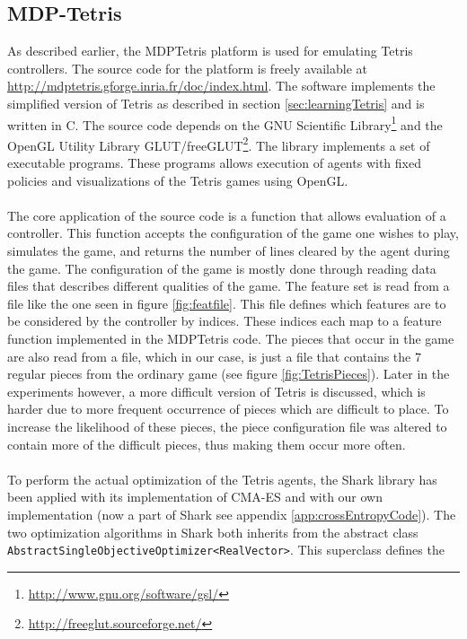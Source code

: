 \subsection{MDP-Tetris \label{sec:MDPTetris}}

As described earlier, the MDPTetris platform is used for emulating Tetris controllers. 
The source code for the 
platform is freely available at \url{http://mdptetris.gforge.inria.fr/doc/index.html}.
The software implements the simplified version of Tetris as described in 
section \ref{sec:learningTetris} and is written in C. The source code depends on
the GNU Scientific Library\footnote{\url{http://www.gnu.org/software/gsl/}} and
the OpenGL Utility 
Library GLUT/freeGLUT\footnote{\url{http://freeglut.sourceforge.net/}}.
The library implements a set of executable programs. These programs 
allows execution of agents with fixed policies and visualizations
of the Tetris games using OpenGL.\\
\\
The core application of the source code is a function that allows evaluation of 
a controller. This function accepts the configuration of the game one wishes to play,
simulates the game, and returns the number of lines cleared by the agent during the game.
The configuration of the game is mostly done through reading data files that describes 
different qualities of the game. The feature set is read from a file
like the one seen in figure \ref{fig:featfile}. This file defines which features are to be 
considered by the controller by indices. These indices each map to a feature function 
implemented in the MDPTetris code. The pieces that occur in the game are also read from a file,
which in our case, is just a file that contains the 7 regular pieces from the ordinary game
(see figure \ref{fig:TetrisPieces}). Later in the experiments however, a more difficult version of Tetris
is discussed, which is harder due to more frequent occurrence of pieces which are difficult to place.
To increase the likelihood of these pieces, the piece configuration file was altered to
contain more of the difficult pieces, thus making them occur more often.\\
\\
To perform the actual optimization of the Tetris agents, the Shark library has been applied
with its implementation of CMA-ES and with our own implementation (now a part of Shark
see appendix \ref{app:crossEntropyCode}). The two optimization algorithms in Shark both 
inherits from the abstract class 
\lstinline$AbstractSingleObjectiveOptimizer<RealVector>$. This superclass defines the
